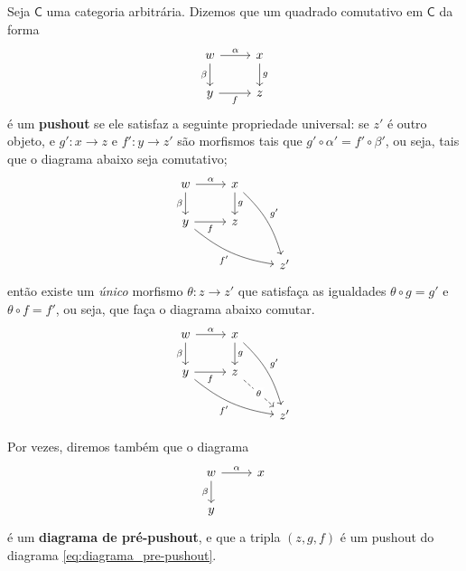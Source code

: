 Seja $\mathsf{C}$ uma categoria arbitrária.
Dizemos que um quadrado comutativo em $\mathsf{C}$ da forma
\begin{equation}\label{eq:diagrama_pushout}
    \begin{tikzcd}
        w
        \arrow[r, "\alpha"]
        \arrow[d, "\beta" swap]
        & x
        \arrow[d, "g"]
        \\ y
        \arrow[r, "f" swap]
        & z
    \end{tikzcd}
\end{equation}
é um \textbf{pushout} se ele satisfaz a seguinte propriedade universal: se $z'$ é outro objeto, e $g': x \to z$ e $f': y \to z'$ são morfismos tais que $g' \circ \alpha' = f' \circ \beta'$, ou seja, tais que o diagrama abaixo seja comutativo;
\begin{displaymath}
    \begin{tikzcd}
        w
        \arrow[r, "\alpha"]
        \arrow[d, "\beta" swap]
        & x
        \arrow[d, "g"]
        \arrow[rdd, bend left=15, "g'"]
        \\ y
        \arrow[r, "f" swap]
        \arrow[rrd, bend right=15, "f'" swap]
        & z
        \\ & & z'
    \end{tikzcd}
\end{displaymath}
então existe um \emph{único} morfismo $\theta: z \to z'$ que satisfaça as igualdades $\theta \circ g = g'$ e $\theta \circ f = f'$, ou seja, que faça o diagrama abaixo comutar.
\begin{displaymath}
    \begin{tikzcd}
        w
        \arrow[r, "\alpha"]
        \arrow[d, "\beta" swap]
        & x
        \arrow[d, "g"]
        \arrow[rdd, bend left=15, "g'"]
        \\ y
        \arrow[r, "f" swap]
        \arrow[rrd, bend right=15, "f'" swap]
        & z
        \arrow[rd, dashed, "\theta" description]
        \\ & & z'
    \end{tikzcd}
\end{displaymath}

Por vezes, diremos também que o diagrama
\begin{equation}\label{eq:diagrama_pre-pushout}
    \begin{tikzcd}
        w
        \arrow[r, "\alpha"]
        \arrow[d, "\beta" swap]
        & x
        \\ y
    \end{tikzcd}
\end{equation}
é um \textbf{diagrama de pré-pushout}, e que a tripla $(z,g,f)$ é um pushout do diagrama \eqref{eq:diagrama_pre-pushout}.

